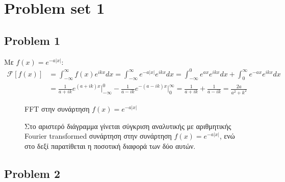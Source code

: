 \section{Problem set 1}
\subsection{Problem 1}

\begin{flushleft}
Με $f(x)=e^{-a|x|}$:
\begin{align*}
\mathcal{F}[f(x)]&= \int_{-\infty}^{\infty} f(x) e^{ik x}dx=\int_{-\infty}^{\infty}e^{-a|x|}e^{ik x}dx=\int_{-\infty}^{0} e^{ax}e^{ik x}dx + \int_{0}^{\infty}e^{-ax}e^{ik x} dx\\&= \frac{1}{a+ik}e^{(a+ik)x}\Biggr|_{-\infty}^{0}-\frac{1}{a-ik}e^{-(a-ik)x}\Biggr|_{0}^{\infty}=\frac{1}{a+ik}+\frac{1}{a-ik}=\frac{2a}{a^{2}+k^{2}}
\end{align*}
\end{flushleft}

\begin{figure}[htp]
\centering
{}\caption{FFT στην συνάρτηση $f(x)=e^{-a|x|}$}\label{fig:1}
\end{figure}


\newpage

\begin{figure}[htp]
\centering
{}\caption{Στο αριστερό διάγραμμα γίνεται σύγκριση αναλυτικής με αριθμητικής Fourier transformed συνάρτηση στην συνάρτηση $f(x)=e^{-a|x|}$, ενώ στο δεξί παρατίθεται η ποσοτική διαφορά των δύο αυτών.}\label{fig:2}
\end{figure}
\clearpage


\subsection{Problem 2}

